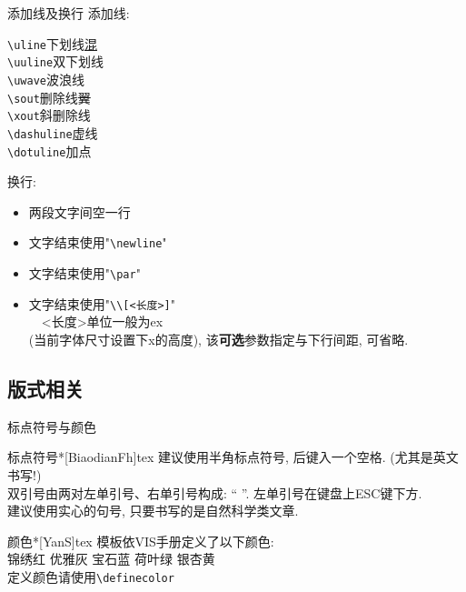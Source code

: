 \documentclass[hyperref, UTF8, CJK, aspectratio=169]{beamer}
\begin{document}
\begin{frame}[fragile]{添加线及换行}
	添加线:
	\begin{multicols}{2}
		\verb|\uline|\hfill 下划线\qquad\uline{混}\\
		\verb|\uuline|\hfill 双下划线\qquad{}\\
		\verb|\uwave|\hfill 波浪线\qquad{}\\
		\verb|\sout|\hfill 删除线\qquad\sout{翼}\\
		\verb|\xout|\hfill 斜删除线\qquad{}\\
		\verb|\dashuline|\hfill 虚线\qquad{}\\
		\verb|\dotuline|\hfill 加点\qquad{}
	\end{multicols}
	换行:
	\begin{multicols}{2}
		\begin{itemize}
			\item 两段文字间空一行
			\item 文字结束使用"\verb!\newline!"
			\item 文字结束使用"\verb!\par!"
			\item 文字结束使用"\verb!\\[<长度>]!"\\
			~~<长度>单位一般为ex\\(当前字体尺寸设置下x的高度), 该\textbf{可选}参数指定与下行间距, 可省略.
		\end{itemize}
	\end{multicols}
\end{frame}

\subsection{版式相关}
\begin{frame}[fragile]{标点符号与颜色}
	\scriptsize
	\begin{univcode}{标点符号}*[BiaodianFh]{tex}
		建议使用半角标点符号, 后键入一个空格. (尤其是英文书写!)\\[1ex]
		双引号由两对左单引号、右单引号构成: ``  ''. 左单引号在键盘上ESC键下方.\\[1ex]
		建议使用实心的句号, 只要书写的是自然科学类文章.
	\end{univcode}
	\begin{univcode}{颜色}*[YanS]{tex}
		模板依VIS手册定义了以下颜色:\\
		\textcolor{univred}{锦绣红}
		\textcolor{univgrey}{优雅灰}
		\textcolor{univblue}{宝石蓝}
		\textcolor{univgreen}{荷叶绿}
		\textcolor{univyellow}{银杏黄}\\
		定义颜色请使用\verb!\definecolor!
	\end{univcode}
\end{frame}
	
\end{document}

